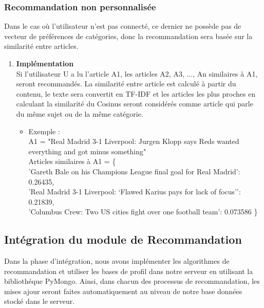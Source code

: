         \subsubsection{Recommandation non personnalisée}
        Dans le cas où l'utilisateur n'est pas connecté, ce dernier ne possède pas de vecteur de préférences de catégories, donc la recommandation sera basée sur la similarité entre articles.
            \begin{enumerate}[leftmargin=*]
                \item\textbf{Implémentation}\\
                Si l'utilisateur U a lu l'article A1, les articles A2, A3, ..., An similaires à A1, seront recommandés. La similarité entre article est calculé à partir du contenu, le texte sera convertit en TF-IDF et les articles les plus proches en calculant la similarité du Cosinus seront considérés comme article qui parle du même sujet ou de la même catégorie.

                \begin{itemize}[leftmargin=*]
                    \item Exemple :\\ 
                    A1 = "Real Madrid 3-1 Liverpool: Jurgen Klopp says Reds wanted everything and got minus something"\\
                    Articles similaires à A1 = \{\\
                    'Gareth Bale on his Champions League final goal for Real Madrid': 0.26435,\\
                    'Real Madrid 3-1 Liverpool: ‘Flawed Karius pays for lack of focus’': 0.21839,\\
                    'Columbus Crew: Two US cities fight over one football team': 0.073586
                    \}
                \end{itemize} 
            \end{enumerate}
    \subsection{Intégration du module de Recommandation}
    Dans la phase d'intégration, nous avons implémenter les algorithmes de recommandation et utiliser les bases de profil dans notre serveur en utilisant la bibliothéque PyMongo. Ainsi, dans chacun des processus de recommandation, les mises ajour seront faites automatiquement au niveau de notre base données stocké dans le serveur.

